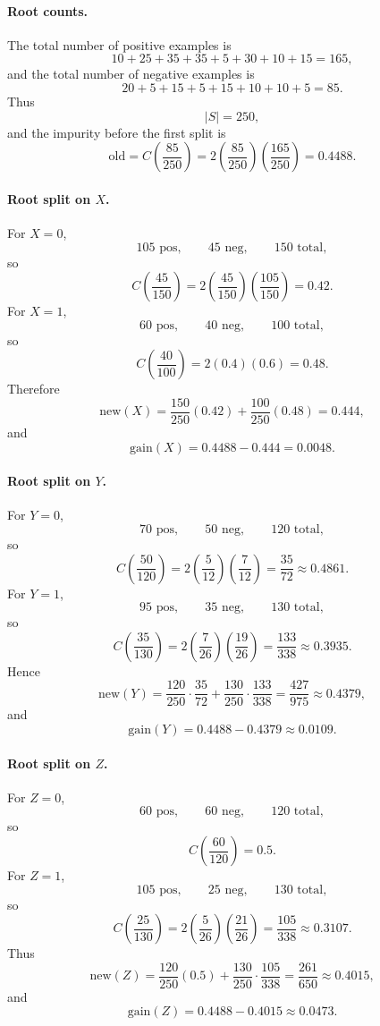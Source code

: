 \documentclass[11pt]{article}
\begin{document}
\paragraph{Root counts.}

The total number of positive examples is
\[
10+25+35+35+5+30+10+15=165,
\]
and the total number of negative examples is
\[
20+5+15+5+15+10+10+5=85.
\]
Thus
\[
|S|=250,
\]
and the impurity before the first split is
\[
\mathrm{old}
=
C\!\left(\frac{85}{250}\right)
=
2\left(\frac{85}{250}\right)\left(\frac{165}{250}\right)
=
0.4488.
\]

\paragraph{Root split on \(X\).}

For \(X=0\),
\[
105\text{ pos},\qquad45\text{ neg},\qquad150\text{ total},
\]
so
\[
C\!\left(\frac{45}{150}\right)
=
2\left(\frac{45}{150}\right)\left(\frac{105}{150}\right)
=
0.42.
\]
For \(X=1\),
\[
60\text{ pos},\qquad40\text{ neg},\qquad100\text{ total},
\]
so
\[
C\!\left(\frac{40}{100}\right)
=
2(0.4)(0.6)
=
0.48.
\]
Therefore
\[
\mathrm{new}(X)
=
\frac{150}{250}(0.42)
+
\frac{100}{250}(0.48)
=
0.444,
\]
and
\[
\mathrm{gain}(X)=0.4488-0.444=0.0048.
\]

\paragraph{Root split on \(Y\).}

For \(Y=0\),
\[
70\text{ pos},\qquad50\text{ neg},\qquad120\text{ total},
\]
so
\[
C\!\left(\frac{50}{120}\right)
=
2\left(\frac{5}{12}\right)\left(\frac{7}{12}\right)
=
\frac{35}{72}
\approx0.4861.
\]
For \(Y=1\),
\[
95\text{ pos},\qquad35\text{ neg},\qquad130\text{ total},
\]
so
\[
C\!\left(\frac{35}{130}\right)
=
2\left(\frac{7}{26}\right)\left(\frac{19}{26}\right)
=
\frac{133}{338}
\approx0.3935.
\]
Hence
\[
\mathrm{new}(Y)
=
\frac{120}{250}\cdot\frac{35}{72}
+
\frac{130}{250}\cdot\frac{133}{338}
=
\frac{427}{975}
\approx0.4379,
\]
and
\[
\mathrm{gain}(Y)
=
0.4488-0.4379
\approx0.0109.
\]

\paragraph{Root split on \(Z\).}

For \(Z=0\),
\[
60\text{ pos},\qquad60\text{ neg},\qquad120\text{ total},
\]
so
\[
C\!\left(\frac{60}{120}\right)=0.5.
\]
For \(Z=1\),
\[
105\text{ pos},\qquad25\text{ neg},\qquad130\text{ total},
\]
so
\[
C\!\left(\frac{25}{130}\right)
=
2\left(\frac{5}{26}\right)\left(\frac{21}{26}\right)
=
\frac{105}{338}
\approx0.3107.
\]
Thus
\[
\mathrm{new}(Z)
=
\frac{120}{250}(0.5)
+
\frac{130}{250}\cdot\frac{105}{338}
=
\frac{261}{650}
\approx0.4015,
\]
and
\[
\mathrm{gain}(Z)
=
0.4488-0.4015
\approx0.0473.
\]
\end{document}
